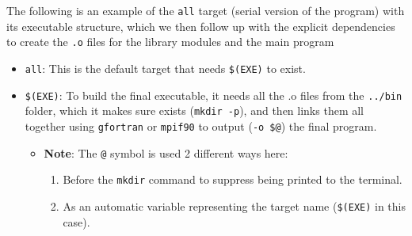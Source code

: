 The following is an example of the \texttt{all} target (serial version
of the program) with its executable structure, which we then follow up
with the explicit dependencies to create the \texttt{.o} files for the
library modules and the main program

\begin{Shaded}
\begin{Highlighting}[]
\DataTypeTok{ }\CharTok{$(}\CharTok{)}

\DataTypeTok{ }\CharTok{$(}\CharTok{)}\DataTypeTok{ }\CharTok{$(}\CharTok{)}
\ErrorTok{    }\CharTok{$(}\CharTok{)}
    \CharTok{$(}\CharTok{)} \CharTok{$(}\CharTok{)} \CharTok{$(}\CharTok{)} \CharTok{$(}\CharTok{)}

\CharTok{\textbackslash{}}
\DataTypeTok{                     }\CharTok{$(}\CharTok{)}

\CharTok{$(}\CharTok{)}
\ErrorTok{    }\CharTok{$(}\CharTok{)}
    \CharTok{$(}\CharTok{)} \CharTok{$(}\CharTok{)}\CharTok{$(}\CharTok{)}\CharTok{$(}\CharTok{)}\CharTok{$\textless{}}
\end{Highlighting}
\end{Shaded}

\begin{itemize}
\tightlist
\item
  \texttt{all}: This is the default target that needs \texttt{\$(EXE)}
  to exist.
\item
  \texttt{\$(EXE)}: To build the final executable, it needs all the .o
  files from the \texttt{../bin} folder, which it makes sure exists
  (\texttt{mkdir\ -p}), and then links them all together using
  \texttt{gfortran} or \texttt{mpif90} to output (\texttt{-o\ \$@}) the
  final program.

  \begin{itemize}
  \tightlist
  \item
    \textbf{Note}: The \texttt{@} symbol is used 2 different ways here:

    \begin{enumerate}
    \def\labelenumi{\arabic{enumi}.}
    \tightlist
    \item
      Before the \texttt{mkdir} command to suppress being printed to the
      terminal.
    \item
      As an automatic variable representing the target name
      (\texttt{\$(EXE)} in this case).
    \end{enumerate}
  \end{itemize}
\end{itemize}

